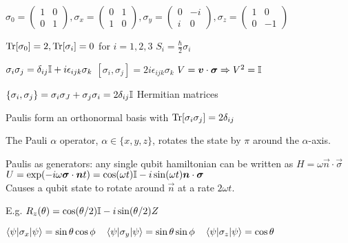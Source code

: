 \begin{squishlist}
    \item $\sigma_0 = \begin{pmatrix} 1 & 0\\ 0 & 1 \end{pmatrix},
        \sigma_x = \begin{pmatrix} 0 & 1 \\ 1 & 0 \end{pmatrix}, 
        \sigma_y=\begin{pmatrix} 0 & -i\\ i & 0\end{pmatrix} , 
        \sigma_z = \begin{pmatrix} 1 & 0 \\ 0 & -1\end{pmatrix}$

    \item $\mathrm{Tr}[\sigma_0] = 2, \mathrm{Tr}[\sigma_i] = 0$ for $i=1,2,3$ \hfill $S_i = \frac{\hbar}{2} \sigma_i$
    \item $\sigma_i \sigma_j = \delta_{ij} \mathbb{I} + i \epsilon_{ijk} \sigma_k$ \quad $[\sigma_i, \sigma_j] = 2i \epsilon_{ijk} \sigma_k$ \squishsep $V = \mbox{\boldmath$v$}\cdot \mbox{\boldmath$\sigma$} \Rightarrow V^2 = \mathbb{I}$
    \item $\{\sigma_i, \sigma_j \} = \sigma_i \sigma_J + \sigma_j\sigma_i = 2 \delta_{ij} \mathbb{I}$ \hfill \squishitem\; Hermitian matrices
    \item Paulis form an orthonormal basis with $\mathrm{Tr}[\sigma_i \sigma_j] = 2\delta_{ij}$
    \item The Pauli $\alpha$ operator, $\alpha \in \{x,y,z\}$, rotates the state by $\pi$ around the $\alpha$-axis.

    \item Paulis as generators: any single qubit hamiltonian can be written as $H = \omega \vec{n}\cdot \vec{\sigma}$ \\
        $U = \exp(-i\omega \mbox{\boldmath$\sigma$}\cdot \mbox{\boldmath$n$} t) = \cos(\omega t) \mathbb{I} - i \sin(\omega t) \mbox{\boldmath$n$}\cdot\mbox{\boldmath$\sigma$}$ \\
        Causes a qubit state to rotate around $\vec{n}$ at a rate $2\omega t$.

    \item E.g. $R_z(\theta) = \cos(\theta/2) \mathbb{I} - i \sin(\theta/2) Z$

    \item $\braket{\psi | \sigma_x | \psi} = \sin\theta \cos\phi \quad \braket{\psi|\sigma_y|\psi} = \sin\theta \sin \phi \quad \braket{\psi|\sigma_z|\psi} = \cos \theta$
\end{squishlist}

